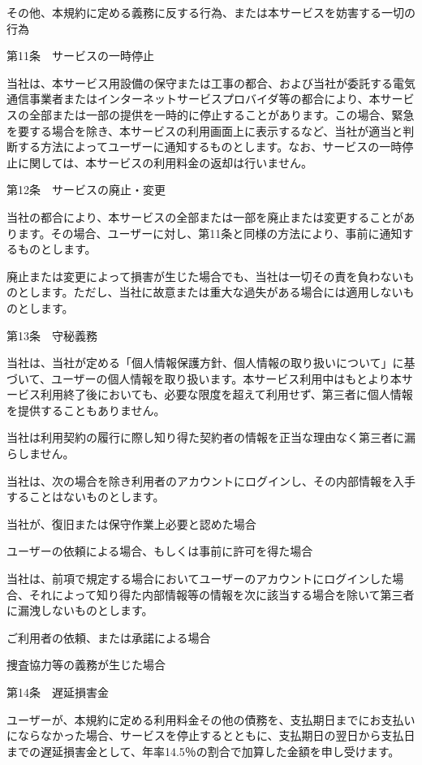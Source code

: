     その他、本規約に定める義務に反する行為、または本サービスを妨害する一切の行為

第11条　サービスの一時停止

    当社は、本サービス用設備の保守または工事の都合、および当社が委託する電気通信事業者またはインターネットサービスプロバイダ等の都合により、本サービスの全部または一部の提供を一時的に停止することがあります。この場合、緊急を要する場合を除き、本サービスの利用画面上に表示するなど、当社が適当と判断する方法によってユーザーに通知するものとします。なお、サービスの一時停止に関しては、本サービスの利用料金の返却は行いません。

第12条　サービスの廃止・変更

    当社の都合により、本サービスの全部または一部を廃止または変更することがあります。その場合、ユーザーに対し、第11条と同様の方法により、事前に通知するものとします。

    廃止または変更によって損害が生じた場合でも、当社は一切その責を負わないものとします。ただし、当社に故意または重大な過失がある場合には適用しないものとします。

第13条　守秘義務

    当社は、当社が定める「個人情報保護方針、個人情報の取り扱いについて」に基づいて、ユーザーの個人情報を取り扱います。本サービス利用中はもとより本サービス利用終了後においても、必要な限度を超えて利用せず、第三者に個人情報を提供することもありません。

    当社は利用契約の履行に際し知り得た契約者の情報を正当な理由なく第三者に漏らしません。 

    当社は、次の場合を除き利用者のアカウントにログインし、その内部情報を入手することはないものとします。

        当社が、復旧または保守作業上必要と認めた場合

        ユーザーの依頼による場合、もしくは事前に許可を得た場合

    当社は、前項で規定する場合においてユーザーのアカウントにログインした場合、それによって知り得た内部情報等の情報を次に該当する場合を除いて第三者に漏洩しないものとします。

        ご利用者の依頼、または承諾による場合

        捜査協力等の義務が生じた場合 

第14条　遅延損害金

    ユーザーが、本規約に定める利用料金その他の債務を、支払期日までにお支払いにならなかった場合、サービスを停止するとともに、支払期日の翌日から支払日までの遅延損害金として、年率14.5％の割合で加算した金額を申し受けます。 

